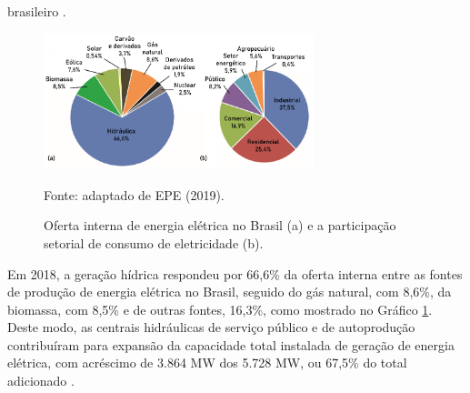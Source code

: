 \begin{onehalfspace}
    brasileiro \cite{EmpresadePesquisaEnergetica-EPE2017,EmpresadePesquisaEnergetica-EPE2017a}.\vspace{-0.7cm} %
    \begin{figure}[ht]
        \centering
        \caption{\small Oferta interna de energia elétrica no Brasil (a) e a participação setorial de consumo de eletricidade (b).}
        \includegraphics[width=0.7\textwidth]{graphs/graph1.png}
        \par \small Fonte: adaptado de EPE (2019).
        \label{Grafico 1}
    \end{figure}\pagebreak
    
    \noindent Em 2018, a geração hídrica respondeu por 66,6\% da oferta interna entre as fontes de 
    produção de energia elétrica no Brasil, seguido do gás natural, com 8,6\%, da biomassa, 
    com 8,5\% e de outras fontes, 16,3\%, como mostrado no Gráfico \ref{Grafico 1}. Deste modo, 
    as centrais hidráulicas de serviço público e de autoprodução contribuíram para expansão 
    da capacidade total instalada de geração de energia elétrica, com acréscimo de 3.864 MW 
    dos 5.728 MW, ou 67,5\% do total adicionado \cite{EmpresadePesquisaEnergetica-EPE2019}.


\end{onehalfspace}
